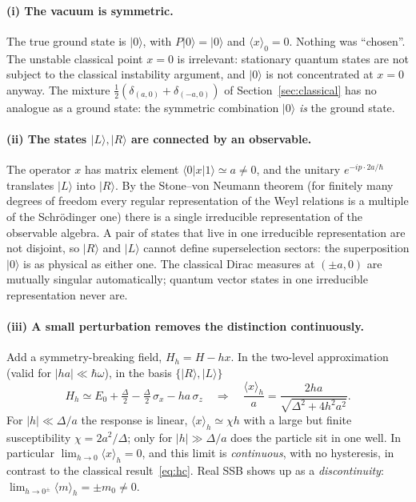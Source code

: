 \documentclass[11pt,a4paper]{article}
\theoremstyle{definition}
\theoremstyle{remark}
\newcommand{\hb}{\hbar}
\newcommand{\ket}[1]{|#1\rangle}
\newcommand{\bra}[1]{\langle #1|}
\newcommand{\ev}[1]{\langle #1\rangle}
\begin{document}
\paragraph{(i) The vacuum is symmetric.} The true ground state is $\ket0$, with $P\ket0=\ket0$ and
$\ev{x}_0=0$. Nothing was ``chosen''. The unstable classical point $x=0$ is irrelevant: stationary quantum
states are not subject to the classical instability argument, and $\ket0$ is not concentrated at $x=0$ anyway.
The mixture $\tfrac12(\delta_{(a,0)}+\delta_{(-a,0)})$ of Section~\ref{sec:classical} has no analogue as a ground
state: the symmetric combination $\ket0$ \emph{is} the ground state.

\paragraph{(ii) The states $\ket L,\ket R$ are connected by an observable.} The operator $x$ has matrix
element $\bra0x\ket1\simeq a\neq0$, and the unitary $e^{-ip\cdot 2a/\hb}$ translates $\ket L$ into
$\ket R$. By the Stone--von Neumann theorem (for finitely many degrees of freedom every regular
representation of the Weyl relations is a multiple of the Schr\"odinger one) there is a single irreducible
representation of the observable algebra. A pair of states that live in one irreducible representation are not
disjoint, so $\ket R$ and $\ket L$ cannot define superselection sectors: the superposition $\ket0$ is as
physical as either one. The classical Dirac measures at $(\pm a,0)$ are mutually singular automatically;
quantum vector states in one irreducible representation never are.

\paragraph{(iii) A small perturbation removes the distinction continuously.} Add a symmetry-breaking field,
$H_h=H-hx$. In the two-level approximation (valid for $|ha|\ll\hb\omega$), in the basis $\{\ket R,\ket L\}$
\begin{equation}
H_h\simeq E_0+\tfrac\Delta2-\tfrac\Delta2\,\sigma_x-ha\,\sigma_z
\quad\Longrightarrow\quad
\frac{\ev{x}_h}{a}=\frac{2ha}{\sqrt{\Delta^2+4h^2a^2}}.
\label{eq:crossover}
\end{equation}
For $|h|\ll\Delta/a$ the response is linear, $\ev{x}_h\simeq\chi h$ with a large but finite susceptibility
$\chi=2a^2/\Delta$; only for $|h|\gg\Delta/a$ does the particle sit in one well. In particular
$\lim_{h\to0}\ev{x}_h=0$, and this limit is \emph{continuous}, with no hysteresis, in contrast to the classical
result~\eqref{eq:hc}. Real SSB shows up as a \emph{discontinuity}: $\lim_{h\to0^\pm}\ev{m}_h=\pm m_0\neq0$.
\end{document}
